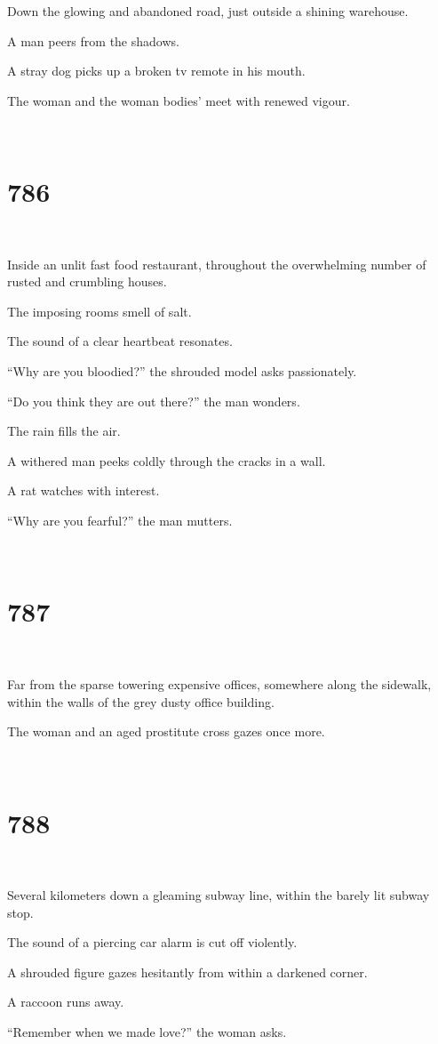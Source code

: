 \documentclass{report}
\begin{document}
Down the glowing and abandoned road, just outside a shining warehouse.

A man peers from the shadows.

A stray dog picks up a broken tv remote in his mouth.

The woman and the woman bodies' meet with renewed vigour.

~
\chapter*{786}
~

Inside an unlit fast food restaurant, throughout the overwhelming number of rusted and crumbling houses.

The imposing rooms smell of salt.

The sound of a clear heartbeat resonates.

``Why are you bloodied?'' the shrouded model asks passionately.

``Do you think they are out there?'' the man wonders.

The rain fills the air.

A withered man peeks coldly through the cracks in a wall.

A rat watches with interest.

``Why are you fearful?'' the man mutters.

~
\chapter*{787}
~

Far from the sparse towering expensive offices, somewhere along the sidewalk, within the walls of the grey dusty office building.

The woman and an aged prostitute cross gazes once more.

~
\chapter*{788}
~

Several kilometers down a gleaming subway line, within the barely lit subway stop.

The sound of a piercing car alarm is cut off violently.

A shrouded figure gazes hesitantly from within a darkened corner.

A raccoon runs away.

``Remember when we made love?'' the woman asks.
\end{document}
